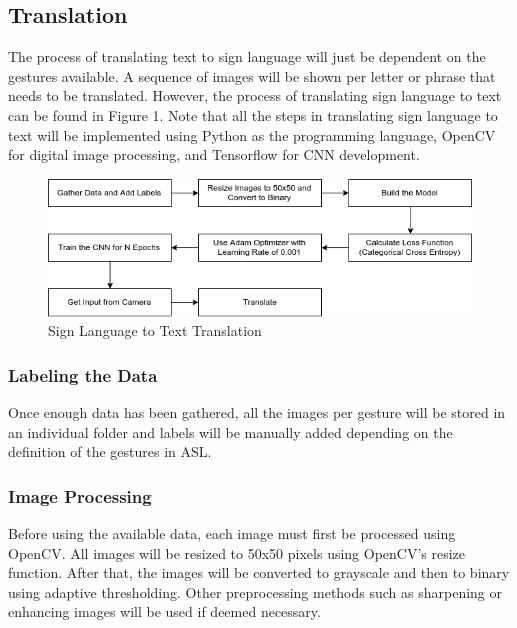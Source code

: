 \documentclass[journal]{./IEEE/IEEEtran}
\begin{document}
\subsection{Translation}
The process of translating text to sign language will just be dependent on the gestures available. A sequence of images will be shown per letter or phrase that needs to be translated. However, the process of translating sign language to text can be found in Figure 1. Note that all the steps in translating sign language to text will be implemented using Python as the programming language, OpenCV for digital image processing, and Tensorflow for CNN development.
\newline
\newline
\newline
\newline
\newline
\newline

\begin{figure}[ht!]
    \centering
    \includegraphics[width=1\linewidth]{./images/methodology.png}
    \caption{Sign Language to Text Translation}
    \label{fig:label1}
\end{figure}

\subsubsection{Labeling the Data}
Once enough data has been gathered, all the images per gesture will be stored in an individual folder and labels will be manually added depending on the definition of the gestures in ASL.
\newline
\subsubsection{Image Processing}
Before using the available data, each image must first be processed using OpenCV. All images will be resized to 50x50 pixels using OpenCV’s resize function. After that, the images will be converted to grayscale and then to binary using adaptive thresholding. Other preprocessing methods such as sharpening or enhancing images will be used if deemed necessary.
\newline
\end{document}
